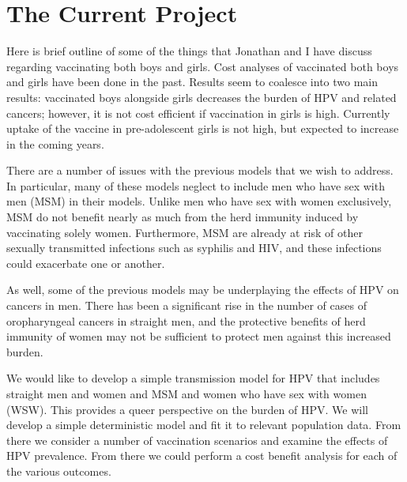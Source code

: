 \documentclass[12pt]{article}
\begin{document}

\section{The Current Project}

Here is brief outline of some of the things that Jonathan and I have discuss regarding vaccinating both boys and girls.  Cost analyses of vaccinated both boys and girls have been done in the past.  Results seem to coalesce into two main results: vaccinated boys alongside girls decreases the burden of HPV and related cancers; however, it is not cost efficient if vaccination in girls is high.  Currently uptake of the vaccine in pre-adolescent girls is not high, but expected to increase in the coming years. 

There are a number of issues with the previous models that we wish to address.  In particular, many of these models neglect to include men who have sex with men (MSM) in their models.  Unlike men who have sex with women exclusively, MSM do not benefit nearly as much from the herd immunity induced by vaccinating solely women.  Furthermore, MSM are already at risk of other sexually transmitted infections such as syphilis and HIV, and these infections could exacerbate one or another.  

As well, some of the previous models may be underplaying the effects of HPV on cancers in men.  There has been a significant rise in the number of cases of oropharyngeal cancers in straight men, and the protective benefits of herd immunity of women may not be sufficient to protect men against this increased burden. 

We would like to develop a simple transmission model for HPV that includes straight men and women and MSM and women who have sex with women (WSW).  This provides a queer perspective on the burden of HPV.  We will develop a simple deterministic model and fit it to relevant population data.  From there we consider a number of vaccination scenarios and examine the effects of HPV prevalence.  From there we could perform a cost benefit analysis for each of the various outcomes.  
\end{document}

